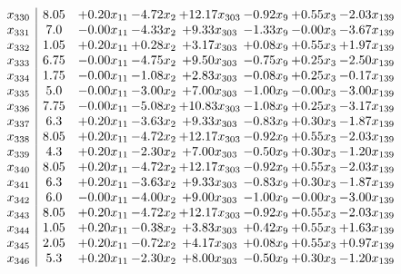 \documentclass[8pt]{article}
\begin{document}
\[\begin{array}{c| c c@{\hskip 2pt} c@{\hskip 2pt} c@{\hskip 2pt} c@{\hskip 2pt} c@{\hskip 2pt} c@{\hskip 2pt} }
 x_{330}   &  8.05 & +  0.20 x_{11} & -4.72 x_{2} & + 12.17 x_{303} & -0.92 x_{9} & +  0.55 x_{3} & -2.03 x_{139}\\
 x_{331}   &  7.0 & -0.00 x_{11} & -4.33 x_{2} & +  9.33 x_{303} & -1.33 x_{9} & -0.00 x_{3} & -3.67 x_{139}\\
 x_{332}   &  1.05 & +  0.20 x_{11} & +  0.28 x_{2} & +  3.17 x_{303} & +  0.08 x_{9} & +  0.55 x_{3} & +  1.97 x_{139}\\
 x_{333}   &  6.75 & -0.00 x_{11} & -4.75 x_{2} & +  9.50 x_{303} & -0.75 x_{9} & +  0.25 x_{3} & -2.50 x_{139}\\
 x_{334}   &  1.75 & -0.00 x_{11} & -1.08 x_{2} & +  2.83 x_{303} & -0.08 x_{9} & +  0.25 x_{3} & -0.17 x_{139}\\
 x_{335}   &  5.0 & -0.00 x_{11} & -3.00 x_{2} & +  7.00 x_{303} & -1.00 x_{9} & -0.00 x_{3} & -3.00 x_{139}\\
 x_{336}   &  7.75 & -0.00 x_{11} & -5.08 x_{2} & + 10.83 x_{303} & -1.08 x_{9} & +  0.25 x_{3} & -3.17 x_{139}\\
 x_{337}   &  6.3 & +  0.20 x_{11} & -3.63 x_{2} & +  9.33 x_{303} & -0.83 x_{9} & +  0.30 x_{3} & -1.87 x_{139}\\
 x_{338}   &  8.05 & +  0.20 x_{11} & -4.72 x_{2} & + 12.17 x_{303} & -0.92 x_{9} & +  0.55 x_{3} & -2.03 x_{139}\\
 x_{339}   &  4.3 & +  0.20 x_{11} & -2.30 x_{2} & +  7.00 x_{303} & -0.50 x_{9} & +  0.30 x_{3} & -1.20 x_{139}\\
 x_{340}   &  8.05 & +  0.20 x_{11} & -4.72 x_{2} & + 12.17 x_{303} & -0.92 x_{9} & +  0.55 x_{3} & -2.03 x_{139}\\
 x_{341}   &  6.3 & +  0.20 x_{11} & -3.63 x_{2} & +  9.33 x_{303} & -0.83 x_{9} & +  0.30 x_{3} & -1.87 x_{139}\\
 x_{342}   &  6.0 & -0.00 x_{11} & -4.00 x_{2} & +  9.00 x_{303} & -1.00 x_{9} & -0.00 x_{3} & -3.00 x_{139}\\
 x_{343}   &  8.05 & +  0.20 x_{11} & -4.72 x_{2} & + 12.17 x_{303} & -0.92 x_{9} & +  0.55 x_{3} & -2.03 x_{139}\\
 x_{344}   &  1.05 & +  0.20 x_{11} & -0.38 x_{2} & +  3.83 x_{303} & +  0.42 x_{9} & +  0.55 x_{3} & +  1.63 x_{139}\\
 x_{345}   &  2.05 & +  0.20 x_{11} & -0.72 x_{2} & +  4.17 x_{303} & +  0.08 x_{9} & +  0.55 x_{3} & +  0.97 x_{139}\\
 x_{346}   &  5.3 & +  0.20 x_{11} & -2.30 x_{2} & +  8.00 x_{303} & -0.50 x_{9} & +  0.30 x_{3} & -1.20 x_{139}\\

\end{array}\]
\end{document}

